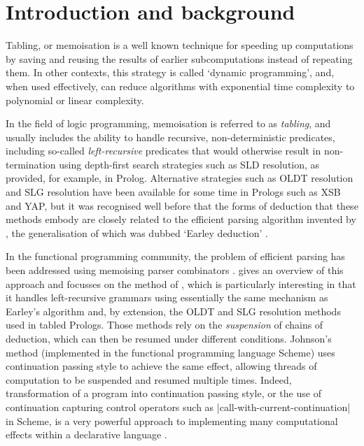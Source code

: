 
\section{Introduction and background}

Tabling, or memoisation \citep{Michie1968} is a well known technique for speeding up computations
by saving and reusing the results of earlier subcomputations instead of repeating
them. In other contexts, this strategy is called `dynamic programming', and, when
used effectively, can reduce algorithms with exponential time complexity to polynomial
or linear complexity. 

In the field of logic programming, memoisation is referred to as \emph{tabling},
and usually includes the ability to handle recursive, non-deterministic predicates, including
so-called \emph{left-recursive} predicates that would otherwise result in non-termination using 
depth-first search strategies
such as SLD resolution, as provided, for example, in Prolog. Alternative strategies
such as OLDT resolution \citep{TamakiSato1986} and SLG resolution \citep{ChenWarren1993} have
been available for some time in Prologs such as XSB and YAP, but it was recognised
well before that the forms of deduction that these methods embody are closely related to
the efficient parsing algorithm invented by \cite{Earley1970}, the generalisation of which
was dubbed `Earley deduction' \citep{Warren1975,PereiraWarren1983,Porter1986}.

In the functional programming community, the problem of efficient parsing has been
addressed using memoising parser combinators \citep{Norvig1991,Leermakers1993}.
\cite{Abdallah2017a} gives an overview of this approach and focusses on the method of
\cite{Johnson1995}, which is particularly
interesting in that it handles left-recursive grammars using essentially the same 
mechanism as Earley's algorithm and, by extension, the OLDT and SLG resolution methods
used in tabled Prologs. Those methods rely on the \emph{suspension} of chains of deduction,
which can then be resumed under different conditions. Johnson's method (implemented in the
functional programming language Scheme) uses continuation
passing style \citep{SussmanSteele1975} to achieve the same effect, allowing threads of
computation to be suspended and resumed multiple times. Indeed, transformation of a program
into continuation passing style, or the use of continuation capturing control operators
such as |call-with-current-continuation| in Scheme, is a very powerful approach
to implementing many computational effects within a declarative language \citep{Filinski1999}.

